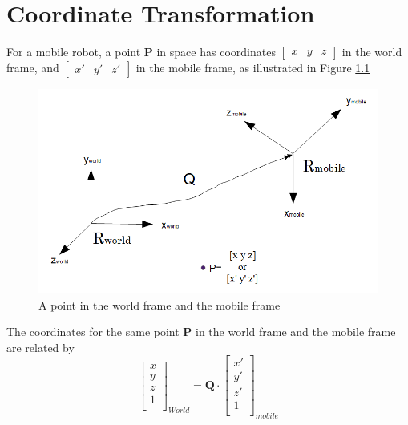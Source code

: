 \chapter{Coordinate Transformation}\label{ch:appendix1}

For a mobile robot, a point $\boldsymbol{P}$ in space has
coordinates $[\begin{matrix}x & y & z\end{matrix}]$ in the world frame, and
$[\begin{matrix}x' & y' & z' \end{matrix}]$ in the mobile frame, as
illustrated in Figure \ref{fig:appx1-1}

\begin{figure}[h]
\centering
\includegraphics[width=12cm, keepaspectratio=true]{./Figures/coordinate_transformation/coordinate_transformation.png}
\caption{A point in the world frame and the mobile frame}
\label{fig:appx1-1}
\end{figure}

The coordinates for the same point $\boldsymbol{P}$ in the world frame
and the mobile frame are related by
\begin{equation}
\begin{bmatrix}
x \\ y \\ z \\ 1 \\
\end{bmatrix}_{World}=\boldsymbol{Q}\cdot\begin{bmatrix}
x' \\ y' \\ z' \\ 1  \\
\end{bmatrix}_{mobile}
\end{equation}

